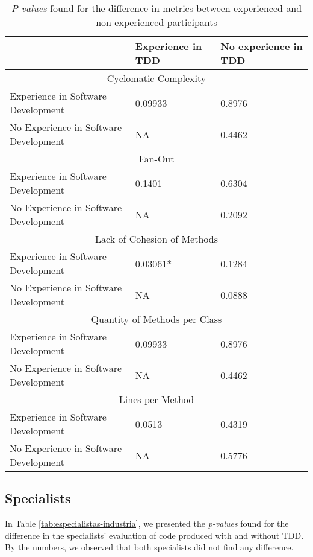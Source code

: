 \documentclass[times]{speauth}
\begin{document}
\begin{table}
	\centering
	\begin{tabular}{ | p{5cm} | p{3.5cm} | p{3.5cm} | }
		\hline
		  & \textbf{Experience in TDD} & \textbf{No experience in TDD} \\
		\hline
			\multicolumn{3}{|c|}{Cyclomatic Complexity} \\
		\hline
			Experience in Software Development 		& 0.09933	&	0.8976\\
			\hline
			No Experience in Software Development 	& NA		&	0.4462\\
		\hline
			\multicolumn{3}{|c|}{Fan-Out}\\
		\hline
			Experience in Software Development 		& 0.1401	&	0.6304\\
			\hline
			No Experience in Software Development 	& NA		&	0.2092\\
		\hline
			\multicolumn{3}{|c|}{Lack of Cohesion of Methods}\\
		\hline
			Experience in Software Development 		& \cellcolor[gray]{0.8}0.03061*	&	0.1284\\
			\hline
			No Experience in Software Development 	& NA		&	0.0888\\
		\hline
			\multicolumn{3}{|c|}{Quantity of Methods per Class} \\
		\hline
			Experience in Software Development 		& 0.09933	&	0.8976\\
			\hline
			No Experience in Software Development 	& NA		&	0.4462\\
		\hline
			\multicolumn{3}{|c|}{Lines per Method}\\
		\hline
			Experience in Software Development 		& 0.0513	&	0.4319\\
			\hline
			No Experience in Software Development 	& NA		&	0.5776\\
		\hline
	\end{tabular}
	\caption{\textit{P-values} found for the difference in metrics between experienced and non experienced participants}
	\label{valores-separados}
\end{table}

\subsection{Specialists}

In Table
\ref{tab:especialistas-industria}, we presented the \textit{p-values} found for the
difference in the specialists' evaluation of code produced with and without TDD.
By the numbers, we observed that both specialists did not find any difference.
\end{document}
